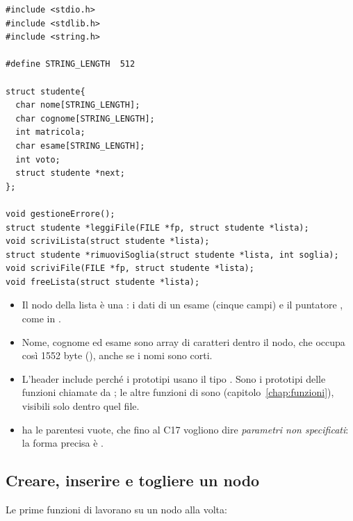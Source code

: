 \begin{affianco}[0.55][c]
\codicepiccolo
\begin{lstlisting}[style=h, name=studente.h]
#include <stdio.h>
#include <stdlib.h>
#include <string.h>

#define STRING_LENGTH  512

struct studente{
  char nome[STRING_LENGTH];
  char cognome[STRING_LENGTH];
  int matricola;
  char esame[STRING_LENGTH];
  int voto;
  struct studente *next;
};

void gestioneErrore();
struct studente *leggiFile(FILE *fp, struct studente *lista);
void scriviLista(struct studente *lista);
struct studente *rimuoviSoglia(struct studente *lista, int soglia);
void scriviFile(FILE *fp, struct studente *lista);
void freeLista(struct studente *lista);
\end{lstlisting}
\risultato
\begin{itemize}
  \item Il nodo della lista è una : i dati di un esame
        (cinque campi) e il puntatore , come in
        .
  \item Nome, cognome ed esame sono array di 
        caratteri dentro il nodo, che occupa così 1552 byte
        (), anche se i nomi sono corti.
  \item L'header include  perché i prototipi usano il tipo
        . Sono i prototipi delle funzioni chiamate da
        ; le altre funzioni di  sono
         (capitolo~\ref{chap:funzioni}), visibili solo dentro
        quel file.
  \item {} ha le parentesi vuote, che fino al C17
        vogliono dire \textit{parametri non specificati}: la forma precisa
        è .
\end{itemize}
\end{affianco}

\subsection{Creare, inserire e togliere un nodo}

Le prime funzioni di  lavorano su un nodo alla volta:

